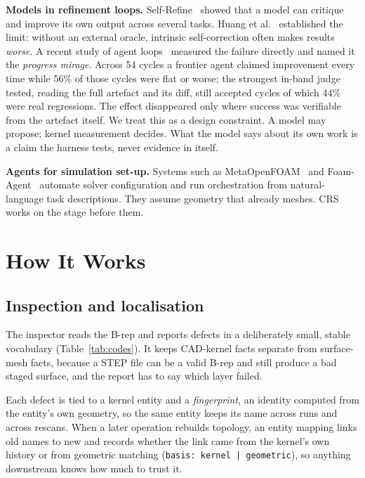 \documentclass[10pt,onecolumn]{article}
\newcommand{\topic}[1]{\textbf{#1.}\hspace{0.5em}\ignorespaces}
\newcommand{\code}[1]{\texttt{\small #1}}
\begin{document}
\topic{Models in refinement loops} Self-Refine~\cite{selfrefine} showed that a model can critique
and improve its own output across several tasks. Huang et al.~\cite{huang} established the limit:
without an external oracle, intrinsic self-correction often makes results \emph{worse}. A recent
study of agent loops~\cite{mirage} measured the failure directly and named it the \emph{progress
mirage}. Across 54 cycles a frontier agent claimed improvement every time while 56\% of those cycles
were flat or worse; the strongest in-band judge tested, reading the full artefact and its diff,
still accepted cycles of which 44\% were real regressions. The effect disappeared only where
success was verifiable from the artefact itself. We treat this as a design constraint. A model may
propose; kernel measurement decides. What the model says about its own work is a claim the harness
tests, never evidence in itself.

\topic{Agents for simulation set-up} Systems such as MetaOpenFOAM~\cite{metaopenfoam} and
Foam-Agent~\cite{foamagent} automate solver configuration and run orchestration from
natural-language task descriptions. They assume geometry that already meshes. CRS works on the stage
before them.

\section{How It Works}\label{sec:how}

\subsection{Inspection and localisation}

The inspector reads the B-rep and reports defects in a deliberately small, stable vocabulary
(Table~\ref{tab:codes}). It keeps CAD-kernel facts separate from surface-mesh facts, because a STEP
file can be a valid B-rep and still produce a bad staged surface, and the report has to say which
layer failed.

Each defect is tied to a kernel entity and a \emph{fingerprint}, an identity computed from the
entity's own geometry, so the same entity keeps its name across runs and across rescans. When a
later operation rebuilds topology, an entity mapping links old names to new and records whether the
link came from the kernel's own history or from geometric matching (\code{basis: kernel |
geometric}), so anything downstream knows how much to trust it.
\end{document}
